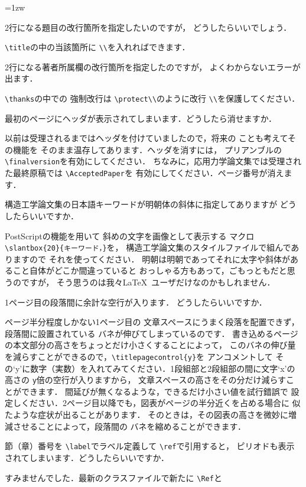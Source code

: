 \documentclass[onecolumn]{jsce}  %
\begin{document}
\def\Qitem{\def\labelenumi{\bf Q.\theenumi:}\item}
\def\Aitem{\addtocounter{enumi}{-1}\def\labelenumi{\bf A.\theenumi:}\item}
\begin{Enumerate}
\parindent=1zw
\Qitem 2行になる題目の改行箇所を指定したいのですが，
どうしたらいいでしょう．
\Aitem \verb+\title+の中の当該箇所に \verb+\\+を入れればできます．
%
\Qitem 2行になる著者所属欄の改行箇所を指定したのですが，
よくわからないエラーが出ます．
\Aitem \verb+\thanks+の中での
強制改行は \verb+\protect\\+のように改行 \verb+\\+を保護してください．
%
\Qitem 最初のページにヘッダが表示されてしまいます．どうしたら消せますか．
\Aitem 以前は受理されるまではヘッダを付けていましたので，将来の
ことも考えてその機能を
そのまま温存してあります．ヘッダを消すには，
プリアンブルの \verb+\finalversion+を有効にしてください．
ちなみに，応用力学論文集では受理された最終原稿では \verb+\AcceptedPaper+を
有効にしてください．ページ番号が消えます．
%
\Qitem 構造工学論文集の日本語キーワードが明朝体の斜体に指定してありますが
どうしたらいいですか．
\Aitem PostScriptの機能を用いて
斜めの文字を画像として表示する
マクロ \verb+\slantbox{20}{キーワード，}+を，
構造工学論文集のスタイルファイルで組んでありますので
それを使ってください．
明朝は明朝であってそれに太字や斜体があること自体がどこか間違っていると
おっしゃる方もあって，ごもっともだと思うのですが，
そう思うのは我々\LaTeX\ ユーザだけなのかもしれません．
%
\Qitem 1ページ目の段落間に余計な空行が入ります．
どうしたらいいですか．\label{item:titlepagecontrol}
\Aitem ページ半分程度しかない1ページ目の
文章スペースにうまく段落を配置できず，段落間に設置されている
バネが伸びてしまっているのです．
書き込めるページの本文部分の高さをちょっとだけ小さくすることによって，
このバネの伸び量を減らすことができるので，\verb+\titlepagecontrol{y}+を
アンコメントして
その`y'に数字（実数）を入れてみてください．1段組部と2段組部の間に文字`x'の
高さの \verb+y+倍の空行が入りますから，
文章スペースの高さをその分だけ減らすことができます．
間延びが無くなるような，できるだけ小さい値を試行錯誤で
設定しください．2ページ目以降でも，図表がページの半分近くを占める場合に
似たような症状が出ることがあります．
そのときは，その図表の高さを微妙に増減させることによって，段落間の
バネを縮めることができます．
%
\Qitem 節（章）番号を \verb+\label+でラベル定義して \verb+\ref+で引用すると，
ピリオドも表示されてしまいます．どうしたらいいですか．
\Aitem すみませんでした．最新のクラスファイルで新たに \verb+\Ref+と

\end{Enumerate}
\end{document}

